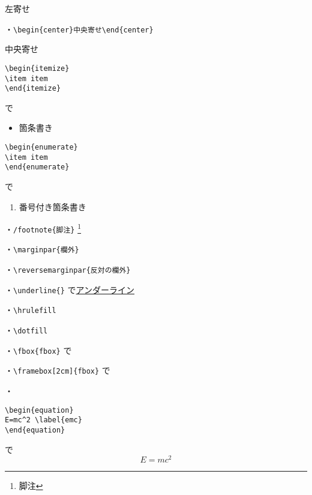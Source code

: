 \documentclass[a4paper,12pt,papersize,twocolumn,titlepage]{jsarticle}
\begin{document}
\begin{flushleft}
左寄せ
\end{flushleft}


・\verb"\begin{center}中央寄せ\end{center}"

\begin{center}
中央寄せ
\end{center}


\begin{verbatim}
\begin{itemize}
\item item
\end{itemize}
\end{verbatim}
で

\begin{itemize}
\item 箇条書き
\end{itemize}


\begin{verbatim}
\begin{enumerate}
\item item
\end{enumerate}
\end{verbatim}
で

\begin{enumerate}
\item 番号付き箇条書き
\end{enumerate}


・\verb"/footnote{脚注}"
\footnote{脚注}


・\verb"\marginpar{欄外}"


・\verb"\reversemarginpar{反対の欄外}"{}


・\verb"\underline{}" で\underline{アンダーライン} 


・\verb"\hrulefill"

\hrulefill


・\verb"\dotfill"

\dotfill


・\verb"\fbox{fbox}"
で


・\verb"\framebox[2cm]{fbox}"
で


・
\begin{verbatim}
\begin{equation}
E=mc^2 \label{emc}
\end{equation}
\end{verbatim}
で
\begin{equation}
E=mc^2 \label{emc}
\end{equation}
\end{document}

